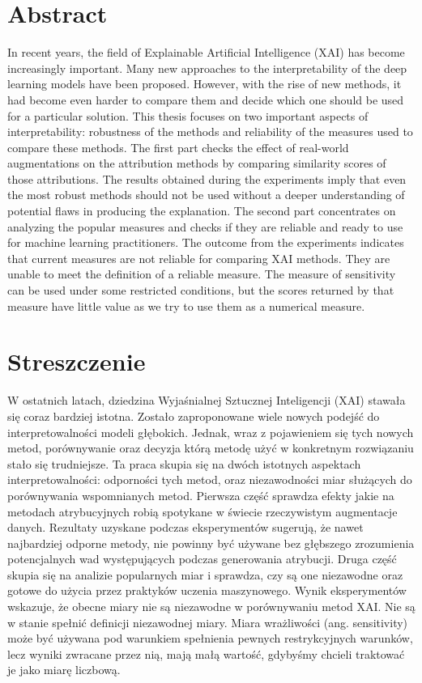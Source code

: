 \section*{Abstract}

In recent years, the field of Explainable Artificial Intelligence (XAI) has become increasingly important. Many new approaches to the interpretability of the deep learning models have been proposed. However, with the rise of new methods, it had become even harder to compare them and decide which one should be used for a particular solution. This thesis focuses on two important aspects of interpretability: robustness of the methods and reliability of the measures used to compare these methods. The first part checks the effect of real-world augmentations on the attribution methods by comparing similarity scores of those attributions. The results obtained during the experiments imply that even the most robust methods should not be used without a deeper understanding of potential flaws in producing the explanation. The second part concentrates on analyzing the popular measures and checks if they are reliable and ready to use for machine learning practitioners. The outcome from the experiments indicates that current measures are not reliable for comparing XAI methods. They are unable to meet the definition of a reliable measure. The measure of sensitivity can be used under some restricted conditions, but the scores returned by that measure have little value as we try to use them as a numerical measure.

\section*{Streszczenie}

W ostatnich latach, dziedzina Wyjaśnialnej Sztucznej Inteligencji (XAI) stawała się coraz bardziej istotna. Zostało zaproponowane wiele nowych podejść do interpretowalności modeli głębokich. Jednak, wraz z pojawieniem się tych nowych metod, porównywanie oraz decyzja którą metodę użyć w konkretnym rozwiązaniu stało się trudniejsze. Ta praca skupia się na dwóch istotnych aspektach interpretowalności: odporności tych metod, oraz niezawodności miar służących do porównywania wspomnianych metod. Pierwsza część sprawdza efekty jakie na metodach atrybucyjnych robią spotykane w świecie rzeczywistym augmentacje danych. Rezultaty uzyskane podczas eksperymentów sugerują, że nawet najbardziej odporne metody, nie powinny być używane bez głębszego zrozumienia potencjalnych wad występujących podczas generowania atrybucji. Druga część skupia się na analizie popularnych miar i sprawdza, czy są one niezawodne oraz gotowe do użycia przez praktyków uczenia maszynowego. Wynik eksperymentów wskazuje, że obecne miary nie są niezawodne w porównywaniu metod XAI. Nie są w stanie spełnić definicji niezawodnej miary. Miara wrażliwości (ang. sensitivity) może być używana pod warunkiem spełnienia pewnych restrykcyjnych warunków, lecz wyniki zwracane przez nią, mają małą wartość, gdybyśmy chcieli traktować je jako miarę liczbową.